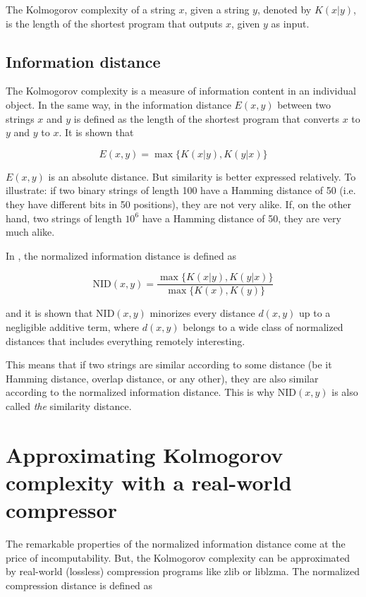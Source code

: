 The Kolmogorov complexity of a string $x$, given a string $y$, denoted by $K(x|y)$, is the length of the shortest program that outputs $x$, given $y$ as input.

\subsection{Information distance}

The Kolmogorov complexity is a measure of information content in an individual object. In the same way, in \cite{Bennett1998} the information distance $E(x, y)$ between two strings $x$ and $y$ is defined as the length of the shortest program that converts $x$ to $y$ and $y$ to $x$. It is shown that

$$ E(x, y) = \max \{ K(x|y), K(y|x) \} $$

$E(x, y)$ is an absolute distance. But similarity is better expressed relatively. To illustrate: if two binary strings of length 100 have a Hamming distance of 50 (i.e. they have different bits in 50 positions), they are not very alike. If, on the other hand, two strings of length $10^{6}$ have a Hamming distance of 50, they are very much alike.

In \cite{Li2004}, the normalized information distance is defined as

\begin{equation}\label{nid}
  \text{NID}(x, y) = \frac{\max \{ K(x|y), K(y|x) \}}{\max \{ K(x), K(y)\}}
\end{equation}

and it is shown that $ \text{NID}(x, y)$ minorizes every distance $d(x, y)$ up to a negligible additive term, where $d(x, y)$ belongs to a wide class of normalized distances that includes everything remotely interesting.

This means that if two strings are similar according to some distance (be it Hamming distance, overlap distance, or any other), they are also similar according to the normalized information distance. This is why $	\text{NID}(x, y)$ is also called \emph{the} similarity distance.

\section{Approximating Kolmogorov complexity with a real-world compressor}

The remarkable properties of the normalized information distance come at the price of incomputability. But, the Kolmogorov complexity can be approximated by real-world (lossless) compression programs like zlib or liblzma. The normalized compression distance \cite{Cilibrasi2005} is defined as

